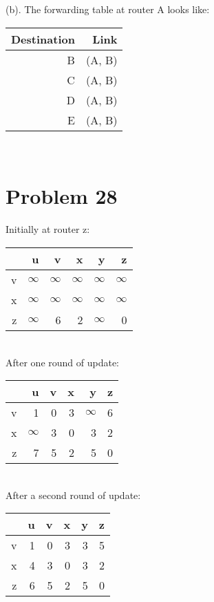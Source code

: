 \documentclass[titlepage, paper=a4, fontsize=11pt]{scrartcl} %
\numberwithin{equation}{section} %
\numberwithin{table}{section} %
\begin{document}
(b).
The forwarding table at router A looks like:
\begin{tabular}{ r | r }
  \hline
  Destination & Link \\
  \hline
  B & (A, B) \\
  C & (A, B) \\
  D & (A, B) \\
  E & (A, B)  \\
  \hline
\end{tabular}
\\




\section*{Problem 28}
Initially at router z:
\begin{tabular}{ r | r | r | r | r | r }
  \hline
  & u & v & x & y & z \\
  \hline
  v & $\infty$ & $\infty$ & $\infty$ & $\infty$ & $\infty$ \\
  x & $\infty$ & $\infty$ & $\infty$ & $\infty$ & $\infty$ \\
  z & $\infty$ & 6 & 2 & $\infty$ & 0 \\
  \hline
\end{tabular}
\\

After one round of update:
\begin{tabular}{ r | r | r | r | r | r }
  \hline
  & u & v & x & y & z \\
  \hline
  v & 1 & 0 & 3 & $\infty$ & 6 \\
  x & $\infty$ & 3 & 0 & 3 & 2 \\
  z & 7 & 5 & 2 & 5 & 0 \\
  \hline
\end{tabular}
\\

After a second round of update:
\begin{tabular}{ r | r | r | r | r | r }
  \hline
  & u & v & x & y & z \\
  \hline
  v & 1 & 0 & 3 & 3 & 5 \\
  x & 4 & 3 & 0 & 3 & 2 \\
  z & 6 & 5 & 2 & 5 & 0 \\
  \hline
\end{tabular}
\\
\end{document}
